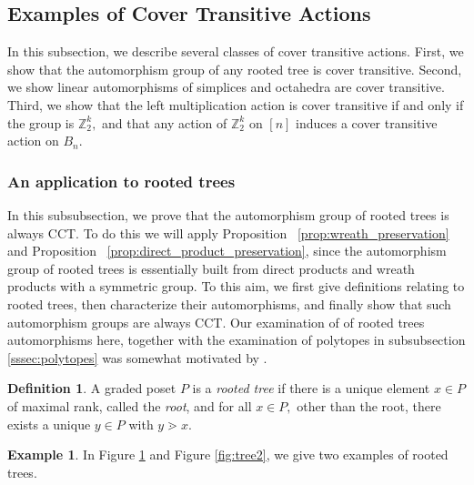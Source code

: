 \documentclass[10 pt]{amsart}
\theoremstyle{plain}
\theoremstyle{definition}
\newtheorem{defn}[thm]{Definition}
\newtheorem{eg}[thm]{Example}
\theoremstyle{remark}
\numberwithin{equation}{section}
\newcommand\ssec{\subsection}
\newcommand\sssec{\subsubsection}
\newcommand\BZ{{\mathbb Z}}
\begin{document}
\ssec{Examples of Cover Transitive Actions}\label{ssec:CCT_examples}

In this subsection, we describe several classes of cover transitive actions. First, we show that the automorphism group of any rooted tree is cover transitive. Second, we show linear automorphisms of simplices and octahedra are cover transitive. Third, we show that the left multiplication action is cover transitive if and only if the group is $\BZ_2^k,$ and that any action of $\BZ_2^k$ on $[n]$ induces a cover transitive action on $B_n.$

\sssec{An application to rooted trees}
\label{ssec:rooted_trees}
In this subsubsection, we prove that the automorphism group of rooted trees is always CCT. To do this we will apply Proposition ~\ref{prop:wreath_preservation} and Proposition ~\ref{prop:direct_product_preservation}, since the automorphism group of rooted trees is essentially built from direct products and wreath products with a symmetric group. To this aim, we first give definitions relating to rooted trees, then characterize their automorphisms, and finally show that such automorphism groups are always CCT. Our examination of of rooted trees automorphisms here, together with the examination of polytopes in subsubsection \ref{sssec:polytopes} was somewhat motivated by \cite[Section 5]{permutation_polytopes}.

\begin{defn}
A graded poset $P$ is a {\it rooted tree} if there is a unique element $x \in P$ of maximal rank, called the {\it root}, and for all $x \in P,$ other than the root, there exists a unique $y \in P$ with $y \gtrdot x.$
\end{defn}

\begin{eg}
In Figure \ref{fig:tree1} and Figure \ref{fig:tree2}, we give two examples of rooted trees.
\end{eg}

\begin{figure}[h!]
\caption{\label{fig:tree1}}
\end{figure}
\end{document}

